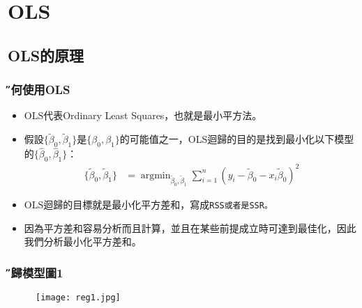 \documentclass[xcolor=dvipsnames]{beamer}
\DeclareMathOperator*{\argmin}{argmin}
\begin{document}
\section{OLS}
\subsection{OLS的原理}
\begin{frame} \frametitle{\H 為何使用OLS}
\begin{itemize}
\item OLS代表Ordinary Least Squares，也就是最小平方法。
\item 假設$ \{\tilde{\beta}_{0},\tilde{\beta}_{1}\} $是$ \{\beta_{0},\beta_{1}\} $的可能值之一，OLS迴歸的目的是找到最小化以下模型的$ \{\hat{\beta}_{0},\hat{\beta}_{1}\} $：
\medskip
\begin{align*}
 \{\tilde{\beta}_{0},\tilde{\beta}_{1}\}&=\argmin_{\tilde{\beta}_{0},\tilde{\beta}_{1}}\sum _{i=1}^n(y_{i}-\tilde{\beta}_{0}-x_{i}\tilde{\beta}_{0})^2 
 \end{align*}

\medskip
\item OLS迴歸的目標就是最小化平方差和，寫成\tt{RSS}或者是\tt{SSR}。
\item 因為平方差和容易分析而且計算，並且在某些前提成立時可達到最佳化，因此我們分析最小化平方差和。
\end{itemize}
\end{frame}
\begin{frame}\frametitle{\H 迴歸模型圖1}
\begin{figure}
\begin{center}
\texttt{[image: reg1.jpg]}
\end{center}
\end{figure}
\end{frame}
\end{document}
